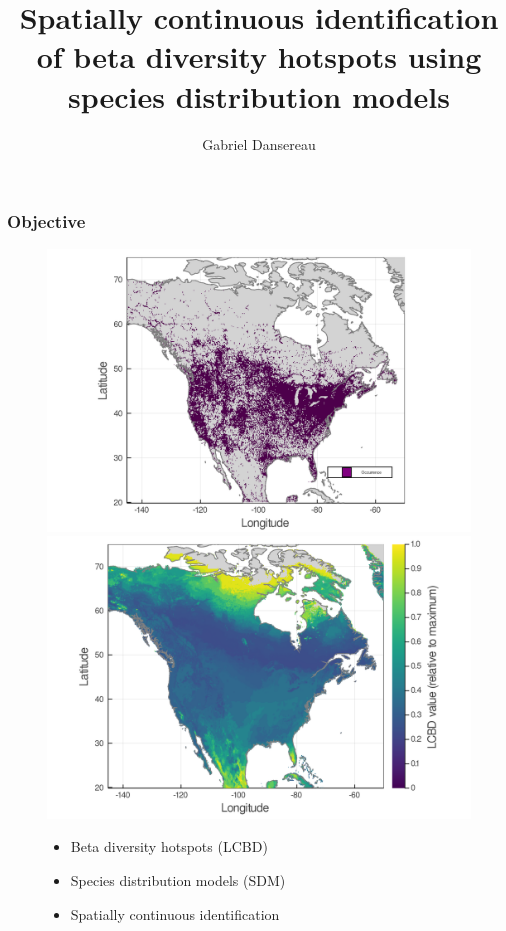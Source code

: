 \documentclass[10pt]{beamer}
\title{Spatially continuous identification of beta diversity hotspots using species distribution models}
\author{Gabriel Dansereau}
\begin{document}
\begin{frame}
  \titlepage
\end{frame}

\begin{frame}
  \frametitle{Objective}
  \begin{figure}
    \centering
    \hspace*{0.0cm}\includegraphics[scale=0.08]{fig/01_raw_singlesp.png}
    \hspace*{0.0cm}\includegraphics[scale=0.08]{fig/05_sdm_lcbd.png}
    \hspace{4.0cm}\begin{itemize}
      \item Beta diversity hotspots (LCBD)
      \item Species distribution models (SDM)
      \item Spatially continuous identification
    \end{itemize}
  \end{figure}
\end{frame}
\end{document}
